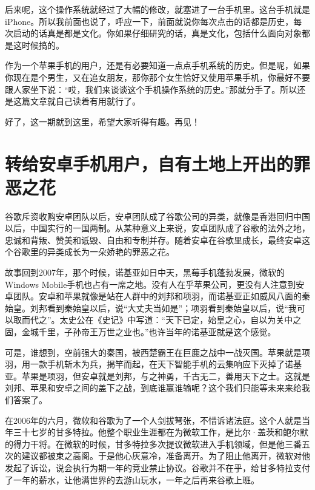 \documentclass[
  letterpaper,
  DIV=11,
  numbers=noendperiod]{scrreprt}
\begin{document}
后来呢，这个操作系统就经过了大幅的修改，就塞进了一台手机里。这台手机就是iPhone。所以我前面也说了，呼应一下，前面就说你每次点击的话都是历史，每次启动的话真是都是文化。你如果仔细研究的话，真是文化，包括什么面向对象都是这时候搞的。

作为一个苹果手机的用户，还是有必要知道一点点手机系统的历史。但是呢，如果你现在是个男生，又在追女朋友，那你那个女生恰好又使用苹果手机，你最好不要跟人家坐下说：``哎，我们来谈谈这个手机操作系统的历史。''那就分手了。所以还是这篇文章就自己读着有用就行了。

好了，这一期就到这里，希望大家听得有趣。再见！


\chapter{转给安卓手机用户，自有土地上开出的罪恶之花}\label{ux8f6cux7ed9ux5b89ux5353ux624bux673aux7528ux6237ux81eaux6709ux571fux5730ux4e0aux5f00ux51faux7684ux7f6aux6076ux4e4bux82b1}

谷歌斥资收购安卓团队以后，安卓团队成了谷歌公司的异类，就像是香港回归中国以后，中国实行的一国两制。从某种意义上来说，安卓团队成了谷歌的法外之地，忠诚和背叛、赞美和诋毁、自由和专制并存。随着安卓在谷歌里成长，最终安卓这个谷歌里的异类成长为一朵娇艳的罪恶之花。

故事回到2007年，那个时候，诺基亚如日中天，黑莓手机蓬勃发展，微软的Windows
Mobile手机也占有一席之地。没有人在乎苹果公司，更没有人注意到安卓团队。安卓和苹果就像是站在人群中的刘邦和项羽，而诺基亚正如威风八面的秦始皇。刘邦看到秦始皇以后，说``大丈夫当如是''；项羽看到秦始皇以后，说``我可以取而代之''。太史公在《史记》中写道：``天下已定，始皇之心，自以为关中之固，金城千里，子孙帝王万世之业也。''也许当年的诺基亚就是这个感觉。

可是，谁想到，空前强大的秦国，被西楚霸王在巨鹿之战中一战灭国。苹果就是项羽，用一款手机斩木为兵，揭竿而起，在天下智能手机的云集响应下灭掉了诺基亚。苹果是项羽，但安卓就是刘邦，与之神勇，千古无二，善用天下之士。这就是刘邦、苹果和安卓之间的盖下之战，到底谁赢谁输呢？这个我们只能等未来来给我们答案了。

在2006年的六月，微软和谷歌为了一个人剑拔弩张，不惜诉诸法庭。这个人就是当年三十七岁的甘多特拉。他整个职业生涯都在为微软工作，是比尔·盖茨和鲍尔默的得力干将。在微软的时候，甘多特拉多次提议微软进入手机领域，但是他三番五次的建议都被束之高阁。于是他心灰意冷，准备离开。为了阻止他离开，微软对他发起了诉讼，说会执行为期一年的竞业禁止协议。谷歌并不在乎，给甘多特拉支付了一年的薪水，让他满世界的去游山玩水，一年之后再来谷歌上班。
\end{document}
